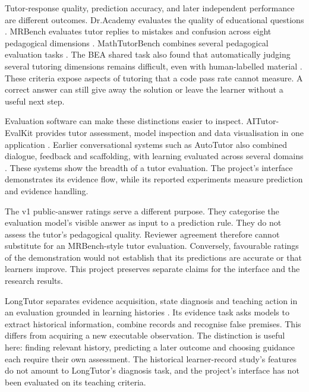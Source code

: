 Tutor-response quality, prediction accuracy, and later independent performance are different outcomes. Dr.Academy evaluates
the quality of educational questions \parencite{chen2024dracademy}. MRBench evaluates tutor replies to mistakes and confusion
across eight pedagogical dimensions \parencite[Sections 3--4]{maurya2025tutorevaluation}. MathTutorBench combines several
pedagogical evaluation tasks \parencite{macina2025mathtutorbench}. The BEA shared task also found that automatically judging
several tutoring dimensions remains difficult, even with human-labelled material \parencite{kochmar2025bea}. These criteria
expose aspects of tutoring that a code pass rate cannot measure. A correct answer can still give away the solution or leave the
learner without a useful next step.

Evaluation software can make these distinctions easier to inspect. AITutor-EvalKit provides tutor assessment, model inspection
and data visualisation in one application \parencite{naeem2026evalkit}. Earlier conversational systems such as AutoTutor also
combined dialogue, feedback and scaffolding, with learning evaluated across several domains \parencite{nye2014autotutor}.
These systems show the breadth of a tutor evaluation. The project's interface demonstrates its evidence flow, while its reported
experiments measure prediction and evidence handling.

The v1 public-answer ratings serve a different purpose. They categorise the evaluation model's visible answer as input to a
prediction rule. They do not assess the tutor's pedagogical quality. Reviewer agreement therefore cannot substitute for an
MRBench-style tutor evaluation. Conversely, favourable ratings of the demonstration would not establish that its predictions
are accurate or that learners improve. This project preserves separate claims for the interface and the research results.

LongTutor separates evidence acquisition, state diagnosis and teaching action in an evaluation grounded in learning histories
\parencite[Section 3.1]{li2026longtutor}. Its evidence task asks models to extract historical information, combine records and
recognise false premises. This differs from acquiring a new executable observation. The distinction is useful here: finding
relevant history, predicting a later outcome and choosing guidance each require their own assessment. The historical learner-record study's
features do not amount to LongTutor's diagnosis task, and the project's interface has not been evaluated on its teaching criteria.

